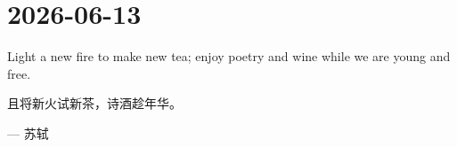 \section*{2026-06-13}
Light a new fire to make new tea; enjoy poetry and wine while we are young and free. \par
且将新火试新茶，诗酒趁年华。 \par
\hfill ---  苏轼 \par
